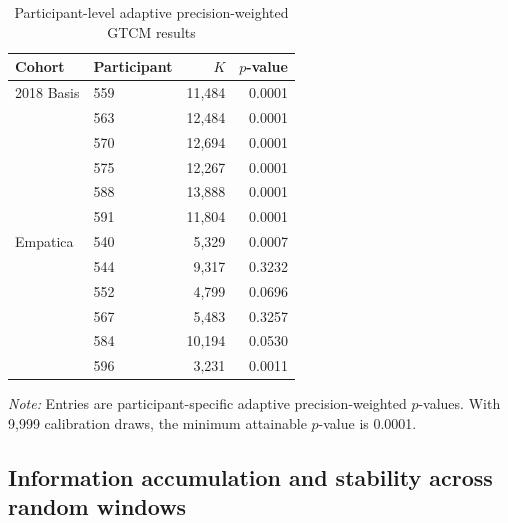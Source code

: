\documentclass[12pt]{article}
\numberwithin{equation}{section}
\begin{document}
\begin{table}[t]
\centering
\caption{Participant-level adaptive precision-weighted GTCM results}
\label{tab:ohiot1dm_primary_participant}
\begin{threeparttable}
\begin{tabular}{llrr}
\toprule
Cohort & Participant & \(K\) & \(p\)-value \\
\midrule
2018 Basis & 559 & 11{,}484 & 0.0001 \\
           & 563 & 12{,}484 & 0.0001 \\
           & 570 & 12{,}694 & 0.0001 \\
           & 575 & 12{,}267 & 0.0001 \\
           & 588 & 13{,}888 & 0.0001 \\
           & 591 & 11{,}804 & 0.0001 \\
\addlinespace
2020 Empatica & 540 & 5{,}329  & 0.0007 \\
              & 544 & 9{,}317  & 0.3232 \\
              & 552 & 4{,}799  & 0.0696 \\
              & 567 & 5{,}483  & 0.3257 \\
              & 584 & 10{,}194 & 0.0530 \\
              & 596 & 3{,}231  & 0.0011 \\
\bottomrule
\end{tabular}

\begin{tablenotes}[flushleft]
\footnotesize
\item \textit{Note:}
Entries are participant-specific adaptive precision-weighted \(p\)-values.
With 9,999 calibration draws, the minimum attainable \(p\)-value is 0.0001.
\end{tablenotes}
\end{threeparttable}
\end{table}

\subsection{Information accumulation and stability across random windows}
\label{sec:ohiot1dm_random_windows}
\end{document}
